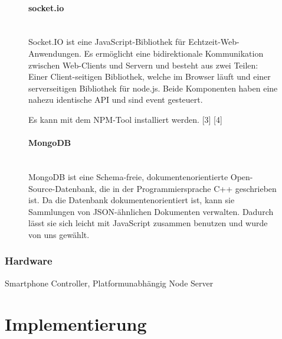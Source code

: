 \documentclass[a4paper]{spie}  %
\begin{document}
\begin{figure}[H]
\begin{minipage}[t]{0.4\textwidth}
\vspace{0pt}
\paragraph{socket.io}\mbox{}\\
Socket.IO ist eine JavaScript-Bibliothek für Echtzeit-Web-Anwendungen. Es ermöglicht eine bidirektionale Kommunikation zwischen Web-Clients und Servern und besteht aus zwei Teilen: Einer Client-seitigen Bibliothek, welche im Browser läuft und einer serverseitigen Bibliothek für node.js. Beide Komponenten haben eine nahezu identische API und sind event gesteuert.


Es kann mit dem NPM-Tool installiert werden. [3] [4]
\end{minipage}
\hfill
\begin{minipage}[t]{0.5\textwidth}
\vspace{0pt}
\paragraph{MongoDB}\mbox{}\\
MongoDB ist eine Schema-freie, dokumentenorientierte Open-Source-Datenbank, die in der Programmiersprache C++ geschrieben ist. Da die Datenbank dokumentenorientiert ist, kann sie Sammlungen von JSON-ähnlichen Dokumenten verwalten. Dadurch lässt sie sich leicht mit JavaScript zusammen benutzen und wurde von uns gewählt.
\end{minipage}
\end{figure}



\subsubsection{Hardware}
Smartphone Controller, Platformunabhängig Node Server

%
%

\section{Implementierung}
\end{document}
